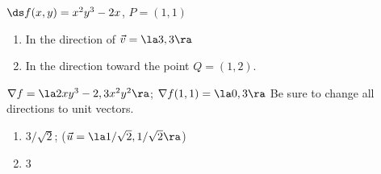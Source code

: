 {$\ds f(x,y) = x^2y^3-2x$, $P = (1,1)$\label{12_05_ex_23}
\begin{enumerate}
	\item In the direction of $\vec v = \la 3,3\ra$
	\item	In the direction toward the point $Q = (1,2)$.
\end{enumerate}
}
{$\nabla f = \la 2xy^3-2,3x^2y^2\ra$; $\nabla f(1,1) = \la 0,3\ra$ Be sure to change all directions to unit vectors.
	\begin{enumerate}
	\item	$3/\sqrt{2}$; ($\vec u = \la 1/\sqrt{2},1/\sqrt{2}\ra$)
	\item	$3$
\end{enumerate}
}